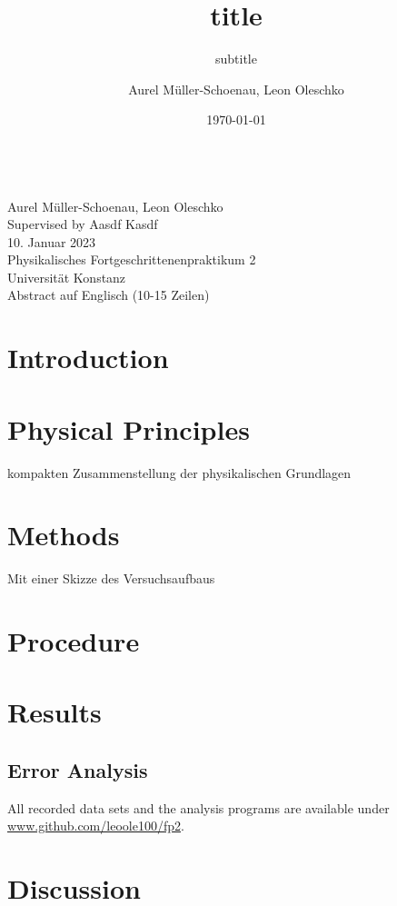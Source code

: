 \documentclass[
    parskip=half, 
    twoside=false,
    twocolumn=true
]{scrarticle}
\begin{document}
\title{title}
\subtitle{subtitle}
\author{Aurel Müller-Schoenau, Leon Oleschko}
\date{\dotdate\today}


\begin{titlepage}
    \sffamily

    \vspace*{3cm}
    {
        \fontsize{32}{32}
    }
    \vspace{.25cm}\\
    {
        \Large
        Aurel Müller-Schoenau, Leon Oleschko\\
        Supervised by Aasdf Kasdf
        \vspace{.05cm}\\
        10. Januar 2023
        \vspace{.25cm}\\
        \normalsize
        Physikalisches Fortgeschrittenenpraktikum 2\\
        Universität Konstanz
    }
    \vspace{3cm}\\
    {
        Abstract auf Englisch (10-15 Zeilen)
        \blindtext[2]
    }
\end{titlepage}


\section{Introduction}
\blindtext

\section{Physical Principles}
kompakten Zusammenstellung der physikalischen Grundlagen
\blindtext

\section{Methods}
Mit einer Skizze des Versuchsaufbaus
\blindtext[3]

\pagebreak
\section{Procedure}
\blindtext[5]

\pagebreak
\section{Results}
\blindtext

\subsection{Error Analysis}
\blindtext

All recorded data sets and the analysis programs are available under \url{www.github.com/leoole100/fp2}.

\pagebreak
\section{Discussion}
\blindtext
\end{document}
